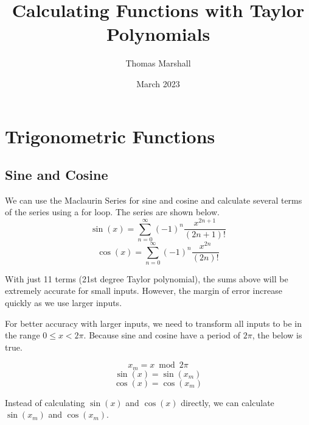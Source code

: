 \documentclass[12pt, letterpaper]{article}
\title{Calculating Functions with Taylor Polynomials}
\author{Thomas Marshall}
\date{March 2023}
\begin{document}
\maketitle

\tableofcontents
\pagebreak

\section{Trigonometric Functions}

\subsection{Sine and Cosine}
We can use the Maclaurin Series for sine and cosine and calculate several terms of the series using a for loop. The series are shown below.
\[ \sin(x) = \sum_{n=0}^{\infty}\left(-1\right)^{n}\frac{x^{2n+1}}{\left(2n+1\right)!} \]
\[ \cos(x) = \sum_{n=0}^{\infty}\left(-1\right)^{n}\frac{x^{2n}}{\left(2n\right)!} \]

With just 11 terms (21st degree Taylor polynomial), the sums above will be extremely accurate for small inputs. However, the margin of error increase quickly as we use larger inputs.

\begin{center}
\end{center}

For better accuracy with larger inputs, we need to transform all inputs to be in the range $0 \leq x < 2\pi$.
Because sine and cosine have a period of $2\pi$, the below is true.

\[ x_m = x \bmod{2\pi} \]
\[ \sin(x) = \sin(x_m) \]
\[ \cos(x) = \cos(x_m) \]

Instead of calculating $\sin(x)$ and $\cos(x)$ directly, we can calculate $\sin(x_m)$ and $\cos(x_m)$.
\end{document}
